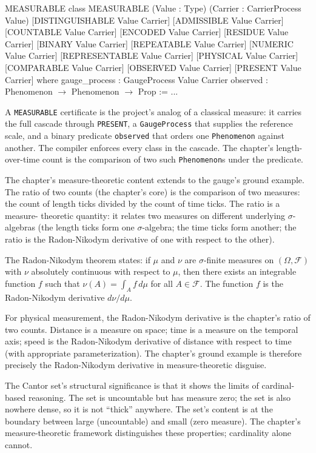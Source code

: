 \begin{leanexcerpt}{MEASURABLE}
class MEASURABLE
    (Value : Type)
    (Carrier : CarrierProcess Value)
    [DISTINGUISHABLE Value Carrier] [ADMISSIBLE Value Carrier]
    [COUNTABLE Value Carrier]       [ENCODED Value Carrier]
    [RESIDUE Value Carrier]         [BINARY Value Carrier]
    [REPEATABLE Value Carrier]      [NUMERIC Value Carrier]
    [REPRESENTABLE Value Carrier]   [PHYSICAL Value Carrier]
    [COMPARABLE Value Carrier]      [OBSERVED Value Carrier]
    [PRESENT Value Carrier]
  where
  gauge_process : GaugeProcess Value Carrier
  observed      : Phenomenon $\to$ Phenomenon $\to$ Prop := ...
\end{leanexcerpt}

A \texttt{MEASURABLE} certificate is the project's analog of a
classical measure: it carries the full cascade through
\texttt{PRESENT}, a \texttt{GaugeProcess} that supplies the
reference scale, and a binary predicate \texttt{observed} that
orders one \texttt{Phenomenon} against another. The compiler
enforces every class in the cascade. The chapter's
length-over-time count is the comparison of two such
\texttt{Phenomenon}s under the predicate.

The chapter's measure-theoretic content extends to the gauge's
ground example. The ratio of two counts (the chapter's core)
is the comparison of two measures: the count of length ticks
divided by the count of time ticks. The ratio is a measure-
theoretic quantity: it relates two measures on different
underlying $\sigma$-algebras (the length ticks form one
$\sigma$-algebra; the time ticks form another; the ratio is
the Radon-Nikodym derivative of one with respect to the other).

The Radon-Nikodym theorem states: if $\mu$ and $\nu$ are
$\sigma$-finite measures on $(\Omega, \mathcal{F})$ with
$\nu$ absolutely continuous with respect to $\mu$, then
there exists an integrable function $f$ such that $\nu(A) =
\int_A f \, d\mu$ for all $A \in \mathcal{F}$. The function $f$
is the Radon-Nikodym derivative $d\nu/d\mu$.

For physical measurement, the Radon-Nikodym derivative is the
chapter's ratio of two counts. Distance is a measure on space;
time is a measure on the temporal axis; speed is the
Radon-Nikodym derivative of distance with respect to time (with
appropriate parameterization). The chapter's ground example is
therefore precisely the Radon-Nikodym derivative in
measure-theoretic disguise.

The Cantor set's structural significance is that it shows the
limits of cardinal-based reasoning. The set is uncountable but
has measure zero; the set is also nowhere dense, so it is not
``thick'' anywhere. The set's content is at the boundary
between large (uncountable) and small (zero measure). The
chapter's measure-theoretic framework distinguishes these
properties; cardinality alone cannot.

